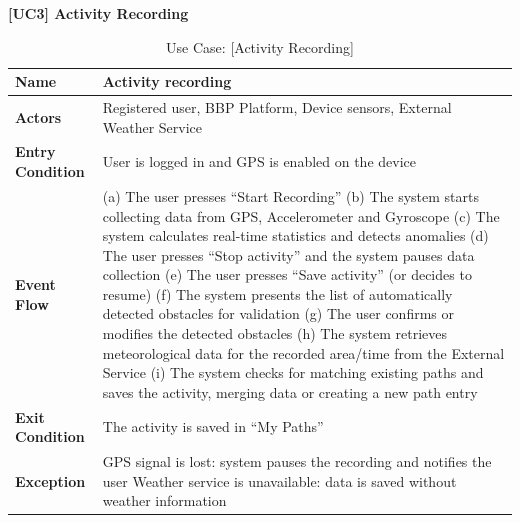 \begin{table}[H]
    \centering
    \raggedright \textbf{\large [UC3] Activity Recording} \\[0.2cm]

    \renewcommand{\arraystretch}{1.5}
    \begin{tabularx}{\textwidth}{|l|X|}
        \hline
        \textbf{Name} & \textbf{Activity recording} \\ \hline
        \textbf{Actors} & Registered user, BBP Platform, Device sensors, External Weather Service \\ \hline
        \textbf{Entry Condition} & User is logged in and GPS is enabled on the device \\ \hline
        \textbf{Event Flow} & 
        (a) The user presses “Start Recording” \newline
        (b) The system starts collecting data from GPS, Accelerometer and Gyroscope \newline
        (c) The system calculates real-time statistics and detects anomalies \newline
        (d) The user presses “Stop activity” and the system pauses data collection \newline
        (e) The user presses “Save activity” (or decides to resume) \newline
        (f) The system presents the list of automatically detected obstacles for validation \newline
        (g) The user confirms or modifies the detected obstacles \newline
        (h) The system retrieves meteorological data for the recorded area/time from the External Service \newline
        (i) The system checks for matching existing paths and saves the activity, merging data or creating a new path entry
        \\ \hline
        \textbf{Exit Condition} & The activity is saved in ``My Paths'' \\ \hline
        \textbf{Exception} & 
        GPS signal is lost: system pauses the recording and notifies the user \newline
        Weather service is unavailable: data is saved without weather information \\ \hline
    \end{tabularx}
    \caption{Use Case: [Activity Recording]}
    \label{tab:uc3_activity_recording}
\end{table}

